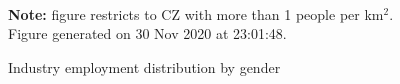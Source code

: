 \begin{figure}[!h]
\centering
\caption{Industry employment distribution by gender}
\label{fig:gender_distribution}
  \\ 
\par \begin{minipage}[h]{\textwidth}{\tiny\textbf{Note:} figure restricts to CZ with more than 1 people per km$^2$. Figure generated on 30 Nov 2020 at 23:01:48.}\end{minipage}
\end{figure}
